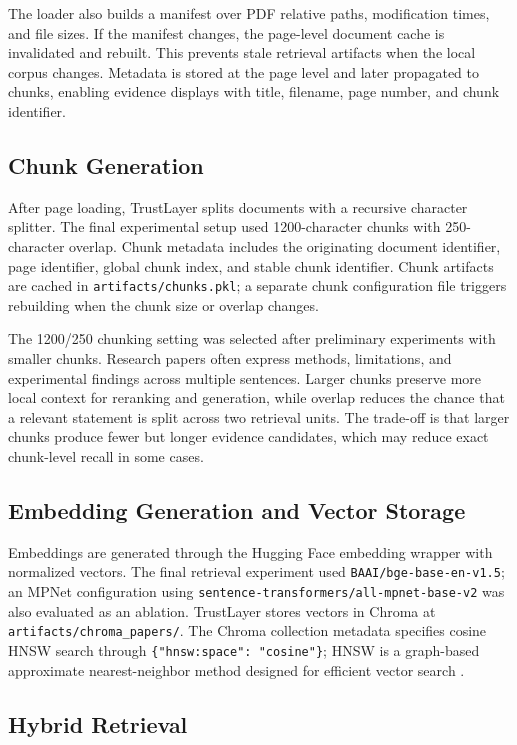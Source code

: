 \documentclass[11pt]{article}
\begin{document}
The loader also builds a manifest over PDF relative paths, modification times, and file sizes. If the manifest changes, the page-level document cache is invalidated and rebuilt. This prevents stale retrieval artifacts when the local corpus changes. Metadata is stored at the page level and later propagated to chunks, enabling evidence displays with title, filename, page number, and chunk identifier.

\subsection{Chunk Generation}

After page loading, TrustLayer splits documents with a recursive character splitter. The final experimental setup used 1200-character chunks with 250-character overlap. Chunk metadata includes the originating document identifier, page identifier, global chunk index, and stable chunk identifier. Chunk artifacts are cached in \texttt{artifacts/chunks.pkl}; a separate chunk configuration file triggers rebuilding when the chunk size or overlap changes.

The 1200/250 chunking setting was selected after preliminary experiments with smaller chunks. Research papers often express methods, limitations, and experimental findings across multiple sentences. Larger chunks preserve more local context for reranking and generation, while overlap reduces the chance that a relevant statement is split across two retrieval units. The trade-off is that larger chunks produce fewer but longer evidence candidates, which may reduce exact chunk-level recall in some cases.

\subsection{Embedding Generation and Vector Storage}

Embeddings are generated through the Hugging Face embedding wrapper with normalized vectors. The final retrieval experiment used \texttt{BAAI/bge-base-en-v1.5}; an MPNet configuration using \texttt{sentence-transformers/all-mpnet-base-v2} was also evaluated as an ablation. TrustLayer stores vectors in Chroma at \texttt{artifacts/chroma\_papers/}. The Chroma collection metadata specifies cosine HNSW search through \texttt{\{"hnsw:space": "cosine"\}}; HNSW is a graph-based approximate nearest-neighbor method designed for efficient vector search \citep{malkov2020hnsw}.

\subsection{Hybrid Retrieval}
\end{document}
